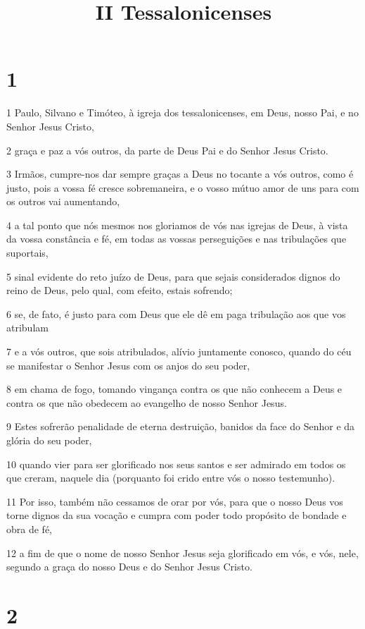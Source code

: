 

\title{II Tessalonicenses}


\chapter{1}

\par 1 Paulo, Silvano e Timóteo, à igreja dos tessalonicenses, em Deus, nosso Pai, e no Senhor Jesus Cristo,
\par 2 graça e paz a vós outros, da parte de Deus Pai e do Senhor Jesus Cristo.
\par 3 Irmãos, cumpre-nos dar sempre graças a Deus no tocante a vós outros, como é justo, pois a vossa fé cresce sobremaneira, e o vosso mútuo amor de uns para com os outros vai aumentando,
\par 4 a tal ponto que nós mesmos nos gloriamos de vós nas igrejas de Deus, à vista da vossa constância e fé, em todas as vossas perseguições e nas tribulações que suportais,
\par 5 sinal evidente do reto juízo de Deus, para que sejais considerados dignos do reino de Deus, pelo qual, com efeito, estais sofrendo;
\par 6 se, de fato, é justo para com Deus que ele dê em paga tribulação aos que vos atribulam
\par 7 e a vós outros, que sois atribulados, alívio juntamente conosco, quando do céu se manifestar o Senhor Jesus com os anjos do seu poder,
\par 8 em chama de fogo, tomando vingança contra os que não conhecem a Deus e contra os que não obedecem ao evangelho de nosso Senhor Jesus.
\par 9 Estes sofrerão penalidade de eterna destruição, banidos da face do Senhor e da glória do seu poder,
\par 10 quando vier para ser glorificado nos seus santos e ser admirado em todos os que creram, naquele dia (porquanto foi crido entre vós o nosso testemunho).
\par 11 Por isso, também não cessamos de orar por vós, para que o nosso Deus vos torne dignos da sua vocação e cumpra com poder todo propósito de bondade e obra de fé,
\par 12 a fim de que o nome de nosso Senhor Jesus seja glorificado em vós, e vós, nele, segundo a graça do nosso Deus e do Senhor Jesus Cristo.

\chapter{2}

